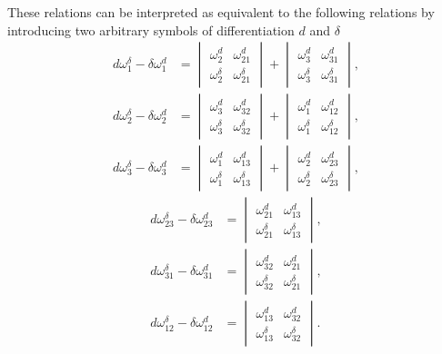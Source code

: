 \documentclass[leqno,12pt]{article}
\theoremstyle{shape1}
\theoremstyle{shape0}
\theoremstyle{shape2}
\theoremstyle{definition}
\begin{document}
These relations can be interpreted as equivalent to the following relations by introducing two arbitrary symbols of differentiation $d$ and $\delta$
\begin{align*}
  d\omega_{1}^{\delta}-\delta\omega_{1}^{d}&=\begin{vmatrix}\omega_{2}^{d}&\omega_{21}^{d}\\\omega_{2}^{\delta}&\omega_{21}^{\delta}\end{vmatrix}+\begin{vmatrix}\omega_{3}^{d}&\omega_{31}^{d}\\\omega_{3}^{\delta}&\omega_{31}^{\delta}\end{vmatrix},\\
  d\omega_{2}^{\delta}-\delta\omega_{2}^{d}&=\begin{vmatrix}\omega_{3}^{d}&\omega_{32}^{d}\\\omega_{3}^{\delta}&\omega_{32}^{\delta}\end{vmatrix}+\begin{vmatrix}\omega_{1}^{d}&\omega_{12}^{d}\\\omega_{1}^{\delta}&\omega_{12}^{\delta}\end{vmatrix},\\
  d\omega_{3}^{\delta}-\delta\omega_{3}^{d}&=\begin{vmatrix}\omega_{1}^{d}&\omega_{13}^{d}\\\omega_{1}^{\delta}&\omega_{13}^{\delta}\end{vmatrix}+\begin{vmatrix}\omega_{2}^{d}&\omega_{23}^{d}\\\omega_{2}^{\delta}&\omega_{23}^{\delta}\end{vmatrix},
\end{align*}
\begin{align*}
  d\omega_{23}^{\delta}-\delta\omega_{23}^{d}&=\begin{vmatrix}\omega_{21}^{d}&\omega_{13}^{d}\\\omega_{21}^{\delta}&\omega_{13}^{\delta}\end{vmatrix},\\
  d\omega_{31}^{\delta}-\delta\omega_{31}^{d}&=\begin{vmatrix}\omega_{32}^{d}&\omega_{21}^{d}\\\omega_{32}^{\delta}&\omega_{21}^{\delta}\end{vmatrix},\\
  d\omega_{12}^{\delta}-\delta\omega_{12}^{d}&=\begin{vmatrix}\omega_{13}^{d}&\omega_{32}^{d}\\\omega_{13}^{\delta}&\omega_{32}^{\delta}\end{vmatrix}.
\end{align*}
\end{document}
